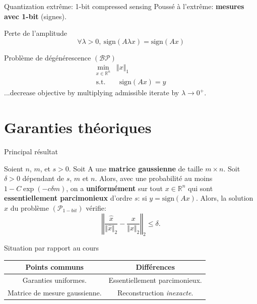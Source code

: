\documentclass[10pt, aspectratio=169]{beamer}
\newcommand{\norm}[1]{\left\Vert #1 \right\Vert}
\begin{document}
  \begin{frame}[t]{Quantization extrême: 1-bit compressed sensing}
    Poussé à l'extrême: \textbf{mesures avec 1-bit} (signes).
   
   \begin{block}{Perte de l'amplitude}
\smallskip
   $$\forall \lambda >0, ~\mathrm{sign}(A\lambda x) = \mathrm{sign}\left(Ax\right)$$
   \end{block} 
   
   \begin{block}{Problème de dégénérescence $(\mathcal B \mathcal P)$}
\smallskip
   \begin{align}
       \min_{x\in\mathbb R^n}{}& \norm{x}_1 \\
       \mathrm{s.t.} & ~~\mathrm{sign}(Ax)=y 
   \end{align}
   ...decrease objective by multiplying admissible iterate by $\lambda \rightarrow 0^+$.
   \end{block} 
  \end{frame}
 \section{Garanties théoriques} 
  \begin{frame}[t]{Principal résultat}
    \begin{theorem}[Théorème 1.1]
        Soient $n$, $m$, et $s >0$. Soit A une \textbf{matrice gaussienne} de taille $m\times n$. Soit $\delta >0$ dépendant de $s$, $m$ et $n$. Alors, avec une probabilité au moins $1 - C\exp(-c \delta m)$, on a \textbf{uniformément} sur tout $x\in\mathbb R^n$ qui sont \textbf{essentiellement parcimonieux} d'ordre $s$: si $ y = \mathrm{sign}(Ax)$. Alors, la solution $\hat x$ du problème $(\mathcal P_{1-bit})$ vérifie:
        $$\left\Vert \frac{\hat x}{\Vert \hat x\Vert_2} - \frac{x}{\Vert x\Vert_2}\right\Vert_2 \leq \delta.$$
    \end{theorem} 
    
    \begin{block}{Situation par rapport au cours}
\smallskip
    
    \begin{table}[ht]
        \centering
        \begin{tabular}{c|c}
             Points communs &  Différences\\
             \hline
             Garanties uniformes. &  Essentiellement parcimonieux.\\
        Matrice de mesure gaussienne. & Reconstruction \emph{inexacte}.
        \end{tabular}
    \end{table}
    \end{block}
  \end{frame}
  
\end{document}
